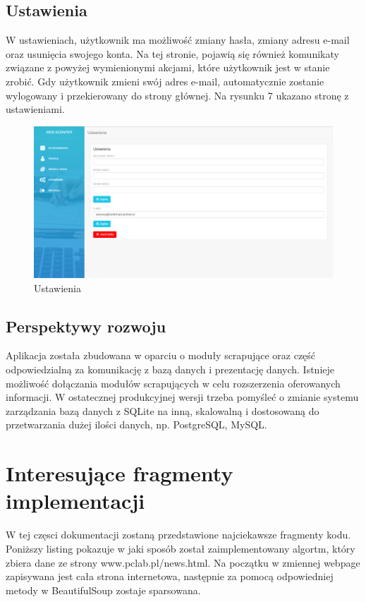 \documentclass[12pt, titlepage]{article}
\begin{document}
	\subsection{Ustawienia}
	W ustawieniach, użytkownik ma możliwość zmiany hasła, zmiany adresu e-mail oraz usunięcia swojego konta. Na tej stronie, pojawią się również komunikaty związane z powyżej wymienionymi akcjami, które użytkownik jest w stanie zrobić. Gdy użytkownik zmieni swój adres e-mail, automatycznie zostanie wylogowany i przekierowany do strony głównej. Na rysunku 7 ukazano stronę z ustawieniami.
	\begin{figure}[H]
		\centering
		\includegraphics[scale=0.45]{obrazki/ustawienia.png}
		\caption{Ustawienia}
		\label{fig:db_schema}
	\end{figure}
	
	\newpage
	\subsection{Perspektywy rozwoju}
	Aplikacja została zbudowana w oparciu o moduły scrapujące oraz część odpowiedzialną za komunikację z bazą danych i prezentację danych. Istnieje możliwość dołączania modułów scrapujących w celu rozszerzenia oferowanych informacji. W ostatecznej produkcyjnej wersji trzeba pomyśleć o zmianie systemu zarządzania bazą danych z SQLite na inną, skalowalną i dostosowaną do przetwarzania dużej ilości danych, np. PostgreSQL, MySQL.
	
	\newpage
	\section{Interesujące fragmenty implementacji}
	W tej częsci dokumentacji zostaną przedstawione 
	najciekawsze fragmenty kodu. Poniższy listing pokazuje w jaki sposób został zaimplementowany algortm, który zbiera dane ze strony www.pclab.pl/news.html. Na początku w zmiennej webpage zapisywana jest cała strona internetowa, następnie za pomocą odpowiedniej metody w BeautifulSoup zostaje sparsowana.  
	
\end{document}
